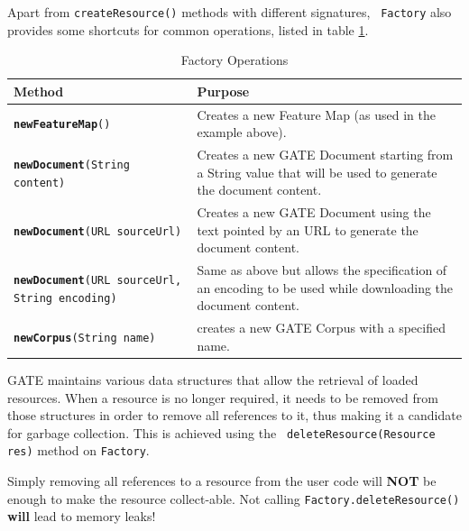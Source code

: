 Apart from {\tt createResource()} methods with different signatures, {\tt
Factory} also provides some shortcuts for common operations, listed in table
\ref{table:factory-op}.


\begin{table}[htbp]
\begin{small}
\begin{center}
\begin{tabular}{|p{}|p{}|}
\hline
\textbf{Method} & \textbf{Purpose}\\
\hline
{\tt {\bf newFeatureMap}()} & Creates a new Feature Map (as used in the
example above). \\
\hline
{\tt {\bf newDocument}(String content)} & Creates a new GATE Document starting
from a String value that will be used to generate the document content.\\
\hline
{\tt {\bf newDocument}(URL sourceUrl)} & Creates a new GATE Document
using the text pointed by an URL  to generate the document content.\\
\hline
{\tt {\bf newDocument}(URL sourceUrl, String encoding)} & Same as
above but allows the specification of an encoding to be used while
downloading the document content.\\
\hline
{\tt {\bf newCorpus}(String name)} & creates a new GATE Corpus with a specified
name.\\
\hline
\end{tabular}
\caption{Factory Operations}
\label{table:factory-op}
\end{center}
\end{small}
\end{table}



GATE maintains various data structures that allow the retrieval of loaded
resources. When a resource is no longer required, it needs to be removed from
those structures in order to remove all references to it, thus making it a
candidate for garbage collection. This is achieved using the {\tt
deleteResource(Resource res)} method on {\tt Factory}.

Simply removing all references to a resource from the user code will
{\bf NOT} be enough to make the resource collect-able. Not calling 
{\tt Factory.deleteResource()} {\bf will} lead to memory leaks!


